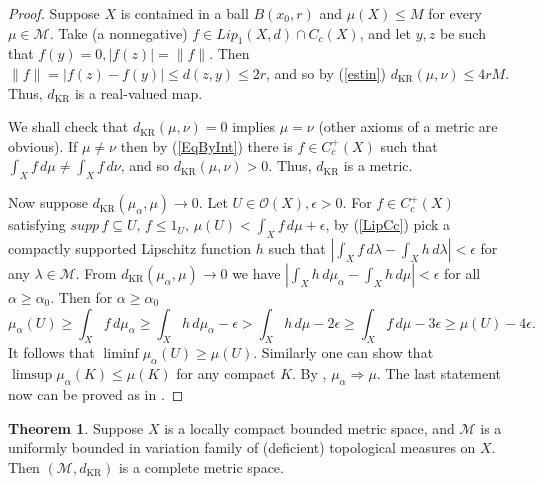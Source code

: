 \documentclass[sn-mathphys-num]{sn-jnl}%
\theoremstyle{thmstyleone}%
\theoremstyle{definition}
\newtheorem{theorem}{Theorem}%
\begin{document}
\begin{proof}
Suppose $X$ is contained in a ball $B(x_0, r)$ and $\mu(X) \le M$ for every $ \mu \in \mathcal{M} $.
Take (a nonnegative) $ f \in Lip_1(X,d) \cap C_c(X) $, and let 
$y, z$ be such that $f(y) =0, | f(z) | = \| f\|$. Then $\| f \|  =  |f(z) - f(y)|  \le d(z, y)  \le 2r$, and  
so by (\ref{estin}) $d_{\text{KR}} (\mu, \nu) \le 4rM$. Thus, $d_{\text{KR}}$ is a real-valued map. 

We shall check that  $d_{\text{KR}} (\mu, \nu) = 0 $ implies $\mu = \nu$ (other axioms of a metric are obvious).
If $ \mu \neq \nu$ then by (\ref{EqByInt}) there is $ f \in C_c^+(X)$ such that $ \int_X f \, d \mu  \neq \int_X f \, d \nu$, 
and so  $d_{\text{KR}} (\mu, \nu) > 0 $. 
Thus,  $d_{\text{KR}}$ is a metric.

Now suppose $ d_{\text{KR}} ( \mu_{\alpha}, \mu) \longrightarrow 0$. Let $ U \in \mathscr{O}(X), \epsilon >0$. 
For  $ f \in C_c^+(X)$ satisfying  $ supp \, f  \subseteq U, \, f \le 1_U, \,  \mu(U) <  \int_X f \, d\mu  + \epsilon$, 
by (\ref{LipCc}) pick a compactly supported Lipschitz function $h$  such that 
$ | \int_X f \, d \lambda - \int_X h \, d \lambda | < \epsilon$ for any $ \lambda \in  \mathcal{M} $. 
From  $d_{\text{KR}} ( \mu_{\alpha}, \mu) \longrightarrow 0$
we have $ | \int_X h \, d \mu_{\alpha} - \int_X h\, d \mu | < \epsilon $ for all $ \alpha \ge \alpha_0$. 
Then  for  $ \alpha \ge \alpha_0$
$$ \mu_{\alpha} (U) \ge   \int_X f\, d \mu_{\alpha} \ge   \int_X h \, d \mu_{\alpha} - \epsilon >  
\int_X h \, d \mu - 2 \epsilon  \ge  \int_X f\, d \mu - 3 \epsilon \ge \mu(U) - 4 \epsilon.$$
It follows that $ \liminf \mu_{\alpha} (U) \ge \mu(U)$. Similarly one can show that $ \limsup \mu_{\alpha} (K) \le \mu(K)$ for any compact $K$.  
By \cite[Th. 2.1]{Butler:WkConv},  $ \mu_{\alpha} \Longrightarrow \mu$.  
The last statement now can be proved as in \cite[Prop. 1.10]{DickZap}. 
\end{proof}

\begin{theorem} \label{completeMS} 
Suppose $X$ is a locally compact bounded metric space, and $\mathcal{M}$ is a uniformly bounded in variation 
family of (deficient) topological measures on $X$. Then $(\mathcal{M}, d_{\text{KR}})$ is a complete metric space.
\end{theorem}
\end{document}

